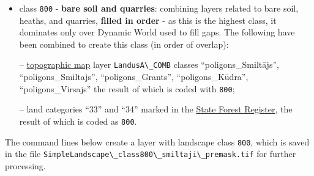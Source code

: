 \documentclass[
]{book}
\newcommand{\passthrough}[1]{#1}
\begin{document}
\begin{itemize}
\item
  class \passthrough{\lstinline!800!} - \textbf{bare soil and quarries}: combining layers related to bare soil,
  heaths, and quarries, \textbf{filled in order} - as this is the highest class, it
  dominates only over Dynamic World used to fill gaps. The following have been
  combined to create this class (in order of overlap):

  -- \hyperref[Ch04.04]{topographic map} layer \passthrough{\lstinline!LandusA\_COMB!} classes
  ``poligons\_Smiltājs'', ``poligons\_Smiltajs'', ``poligons\_Grants'', ``poligons\_Kūdra'',
  ``poligons\_Virsajs'' the result of which is coded with \passthrough{\lstinline!800!};

  -- land categories ``33'' and ``34'' marked in the \hyperref[Ch04.01]{State Forest Register},
  the result of which is coded as \passthrough{\lstinline!800!}.
\end{itemize}

The command lines below create a layer with landscape class \passthrough{\lstinline!800!}, which is saved
in the file \passthrough{\lstinline!SimpleLandscape\_class800\_smiltaji\_premask.tif!} for further processing.
\end{document}
